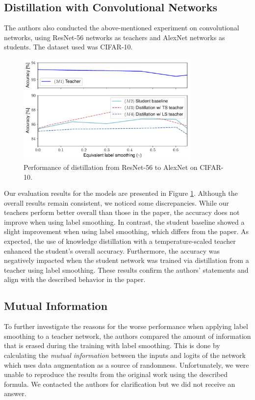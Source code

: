 \subsection{Distillation with Convolutional Networks}
The authors also conducted the above-mentioned experiment on convolutional networks, using ResNet-56 networks as teachers and AlexNet networks as students. The dataset used was CIFAR-10.

\begin{figure}[ht]
\centering
\includegraphics[width=0.8\textwidth]{figures/knowledge_distillation.pdf}
\caption{Performance of distillation from ResNet-56 to AlexNet on CIFAR-10.}
\label{fig:conv_dist}

\end{figure}
Our evaluation results for the models are presented in Figure \ref{fig:conv_dist}. Although the overall results remain consistent, we noticed some discrepancies. While our teachers perform better overall than those in the paper, the accuracy does not improve when using label smoothing. In contrast, the student baseline showed a slight improvement when using label smoothing, which differs from the paper. 
As expected, the use of knowledge distillation with a temperature-scaled teacher enhanced the student's overall accuracy. Furthermore, the accuracy was negatively impacted when the student network was trained via distillation from a teacher using label smoothing. These results confirm the authors' statements and align with the described behavior in the paper.

\subsection{Mutual Information}
To further investigate the reasons for the worse performance when applying label smoothing to a teacher network, the authors compared the amount of information that is erased during the training with label smoothing. This is done by calculating the \textit{mutual information} between the inputs and logits of the network which uses data augmentation as a source of randomness.
Unfortunately, we were unable to reproduce the results from the original work using the described formula. We contacted the authors for clarification but we did not receive an answer.

